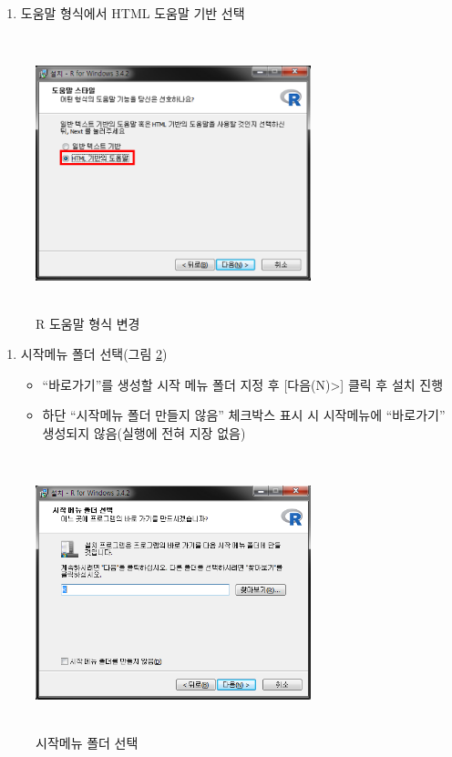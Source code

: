 \documentclass[11pt,a4paper]{book}
\providecommand{\tightlist}{%
  \setlength{\itemsep}{0pt}\setlength{\parskip}{0pt}}
\theoremstyle{definition}
\theoremstyle{definition}
\theoremstyle{definition}
\theoremstyle{remark}
\begin{document}
\begin{enumerate}
\def\labelenumi{\arabic{enumi}.}
\setcounter{enumi}{12}
\tightlist
\item
  도움말 형식에서 HTML 도움말 기반 선택
\end{enumerate}

\begin{figure}[H]
{
  \centering
  \includegraphics[width = 8cm, height = 8cm]{Figures/R-install-F07.png}
  \caption[R 도움말 형식 변경]{R 도움말 형식 변경}\label{fig:R-install-12}
}
\end{figure}

\begin{enumerate}
\def\labelenumi{\arabic{enumi}.}
\setcounter{enumi}{13}
\tightlist
\item
  시작메뉴 폴더 선택(그림 \ref{fig:R-install-13})

  \begin{itemize}
  \tightlist
  \item
    ``바로가기''를 생성할 시작 메뉴 폴더 지정 후
    {[}다음(N)\textgreater{}{]} 클릭 후 설치 진행
  \item
    하단 ``시작메뉴 폴더 만들지 않음'' 체크박스 표시 시 시작메뉴에
    ``바로가기'' 생성되지 않음(실행에 전혀 지장 없음)
  \end{itemize}
\end{enumerate}

\begin{figure}[H]
{
  \centering
  \includegraphics[width = 8cm, height = 8cm]{Figures/R-install-F08.png}
  \caption[시작메뉴 폴더 선택]{시작메뉴 폴더 선택}\label{fig:R-install-13}
}
\end{figure}
\end{document}
